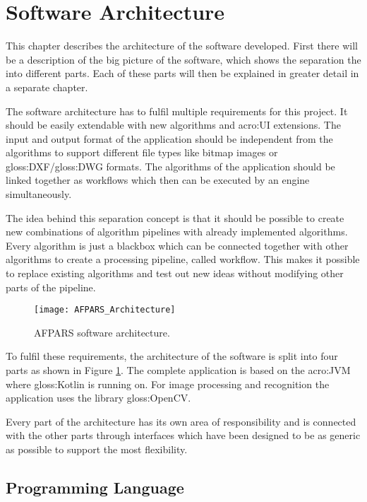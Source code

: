 \section{Software Architecture}
This chapter describes the architecture of the software developed. First there will be a description of the big picture of the software, which shows the separation the into different parts. Each of these parts will then be explained in greater detail in a separate chapter.

The software architecture has to fulfil multiple requirements for this project. It should be easily extendable with new algorithms and \acrshort{acro:UI} extensions. The input and output format of the application should be independent from the algorithms to support different file types like bitmap images or \gls{gloss:DXF}/\gls{gloss:DWG} formats. The algorithms of the application should be linked together as workflows which then can be executed by an engine simultaneously.

The idea behind this separation concept is that it should be possible to create new combinations of algorithm pipelines with already implemented algorithms. Every algorithm is just a blackbox which can be connected together with other algorithms to create a processing pipeline, called workflow. This makes it possible to replace existing algorithms and test out new ideas without modifying other parts of the pipeline. 

\begin{figure}[h]
  \centering
      \texttt{[image: AFPARS\_Architecture]}
  \caption{AFPARS software architecture.}
  \label{fig:AFPARS_Architecture}
\end{figure}


To fulfil these requirements, the architecture of the software is split into four parts as shown in Figure \ref{fig:AFPARS_Architecture}. The complete application is based on the \acrfull{acro:JVM} where \gls{gloss:Kotlin} is running on. For image processing and recognition the application uses the library \gls{gloss:OpenCV}.

Every part of the architecture has its own area of responsibility and is connected with the other parts through interfaces which have been designed to be as generic as possible to support the most flexibility.

\subsection{Programming Language}

